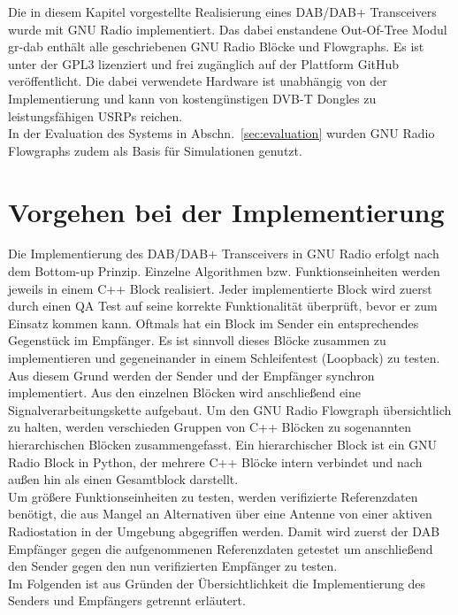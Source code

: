 Die in diesem Kapitel vorgestellte Realisierung eines DAB/DAB+ Transceivers wurde mit GNU Radio implementiert. Das dabei enstandene Out-Of-Tree Modul gr-dab enthält alle geschriebenen GNU Radio Blöcke und Flowgraphs. Es ist unter der \ac{GPL3} lizenziert und frei zugänglich auf der Plattform GitHub~\cite{repo:gr-dab} veröffentlicht. Die dabei verwendete Hardware ist unabhängig von der Implementierung und kann von kostengünstigen DVB-T Dongles zu leistungsfähigen \acp{USRP} reichen.\\
In der Evaluation des Systems in Abschn.~\ref{sec:evaluation} wurden GNU Radio Flowgraphs zudem als Basis für Simulationen genutzt.

\section{Vorgehen bei der Implementierung}
Die Implementierung des DAB/DAB+ Transceivers in GNU Radio erfolgt nach dem Bottom-up Prinzip. Einzelne Algorithmen bzw. Funktionseinheiten werden jeweils in einem C++ Block realisiert. Jeder implementierte Block wird zuerst durch einen \ac{QA} Test auf seine korrekte Funktionalität überprüft, bevor er zum Einsatz kommen kann. Oftmals hat ein Block im Sender ein entsprechendes Gegenstück im Empfänger. Es ist sinnvoll dieses Blöcke zusammen zu implementieren und gegeneinander in einem Schleifentest (Loopback) zu testen. Aus diesem Grund werden der Sender und der Empfänger synchron implementiert. Aus den einzelnen Blöcken wird anschließend eine Signalverarbeitungskette aufgebaut. Um den GNU Radio Flowgraph übersichtlich zu halten, werden verschieden Gruppen von C++ Blöcken zu sogenannten hierarchischen Blöcken zusammengefasst. Ein hierarchischer Block ist ein GNU Radio Block in Python, der mehrere C++ Blöcke intern verbindet und nach außen hin als einen Gesamtblock darstellt.\\
Um größere Funktionseinheiten zu testen, werden verifizierte Referenzdaten benötigt, die aus Mangel an Alternativen über eine Antenne von einer aktiven Radiostation in der Umgebung abgegriffen werden. Damit wird zuerst der DAB Empfänger gegen die aufgenommenen Referenzdaten getestet um anschließend den Sender gegen den nun verifizierten Empfänger zu testen.\\
Im Folgenden ist aus Gründen der Übersichtlichkeit die Implementierung des Senders und Empfängers getrennt erläutert.